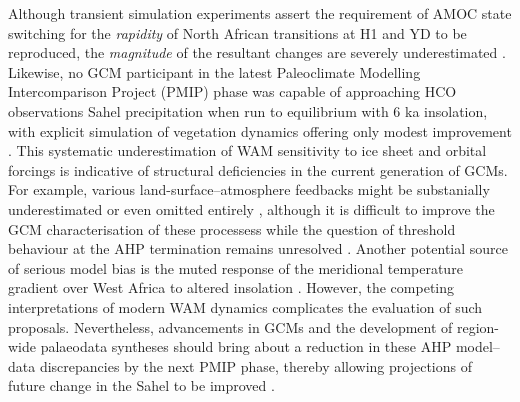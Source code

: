 \documentclass[a4paper]{article}
\begin{document}
Although transient simulation experiments assert the requirement of AMOC state switching for the \emph{rapidity} of North African transitions at H1 and YD to be reproduced, the \emph{magnitude} of the resultant changes are severely underestimated \parencite{timm2010mechanisms, otto2014coherent}. 
Likewise, no GCM participant in the latest Paleoclimate Modelling Intercomparison Project (PMIP) phase was capable of approaching HCO observations Sahel precipitation when run to equilibrium with 6 ka insolation, with explicit simulation of vegetation dynamics offering only modest improvement \parencite{braconnot2012evaluation, zheng2013characterization, harrison2015evaluation}.
This systematic underestimation of WAM sensitivity to ice sheet and orbital forcings is indicative of structural deficiencies in the current generation of GCMs.
For example, various land-surface--atmosphere feedbacks might be substanially underestimated or even omitted entirely  \parencite{harrison2015evaluation, tierney2017rainfall}, although it is difficult to improve the GCM characterisation of these processess while the question of threshold behaviour at the AHP termination remains unresolved \parencite{claussen2017theory}. 
Another potential source of serious model bias is the muted response of the meridional temperature gradient over West Africa to altered insolation \parencite{zheng2013characterization}.
However, the competing interpretations of modern WAM dynamics complicates the evaluation of such proposals. 
Nevertheless, advancements in GCMs and the development of region-wide palaeodata syntheses should bring about a reduction in these AHP model--data discrepancies by the next PMIP phase, thereby allowing projections of future change in the Sahel to be improved \parencite{braconnot2012evaluation, harrison2015evaluation}.

\printbibliography{}
\end{document}
